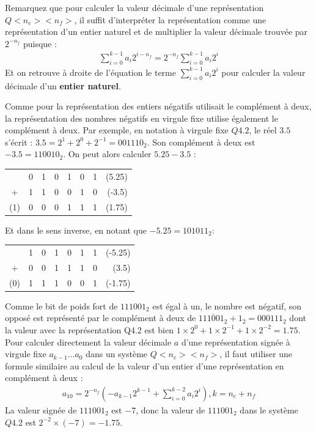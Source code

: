 Remarquez que pour calculer la valeur décimale d'une représentation $Q<n_e><n_f>$, il suffit d'interpréter la représentation comme une représentation d'un entier naturel et de multiplier la valeur décimale trouvée par $2^{-n_f}$ puisque :
\begin{eqnarray*}
\sum_{i=0}^{k-1} a_i 2^{i-n_f} = 2^{-n_f} \sum_{i=0}^{k-1} a_i 2^{i}
\end{eqnarray*}
Et on retrouve à droite de l'équation le terme $\sum_{i=0}^{k-1} a_i 2^{i}$ pour calculer la valeur décimale d'un \textbf{entier naturel}.

Comme pour la représentation des entiers négatifs utilisait le complément à deux, la représentation des nombres négatifs en virgule fixe utilise également le complément à deux. Par exemple, en notation à virgule fixe $Q4.2$, le réel $3.5$ s'écrit : $3.5 = 2^1 + 2^0 + 2^{-1} = 001110_2$. Son complément à deux est $-3.5 = 110010_2$. On peut alors calculer $5.25 - 3.5$ :

\begin{tabular}{cccccccr}
& 0 & 1 & 0 & 1 & 0 & 1 & (5.25)\\
+ & 1 & 1 & 0 & 0 & 1 & 0 & (-3.5)\\
\hline
(1) & 0& 0& 0& 1 & 1 & 1 & (1.75)
\end{tabular}

Et dans le sens inverse, en notant que $-5.25 = 101011_2$:

\begin{tabular}{cccccccr}
& 1 & 0 & 1 & 0 & 1 & 1 & (-5.25)\\
+ & 0 & 0 & 1 & 1 & 1 & 0 & (3.5)\\
\hline
(0) & 1& 1& 1& 0 & 0 & 1 & (-1.75)
\end{tabular}

Comme le bit de poids fort de $111001_2$ est égal à un, le nombre est négatif, son opposé est représenté par le complément à deux de $\overline{111001_2} + 1_2 = 000111_2$ dont la valeur avec la représentation Q4.2 est bien $1\times 2^0 + 1 \times 2^{-1} + 1 \times 2^{-2} = 1.75$. Pour calculer directement la valeur décimale $a$ d'une représentation signée à virgule fixe $a_{k-1}...a_0$ dans un système $Q<n_e><n_f>$, il faut utiliser une formule similaire au calcul de la valeur d'un entier d'une représentation en complément à deux :
\begin{eqnarray*}
a_{10} = 2^{-n_f} (-a_{k-1} 2^{k-1} + \sum_{i=0}^{k-2} a_i 2^i), k = n_e + n_f
\end{eqnarray*}
La valeur signée de $111001_2$ est $-7$, donc la valeur de $111001_2$ dans le système $Q4.2$ est $2^{-2} \times (-7) = -1.75$.

